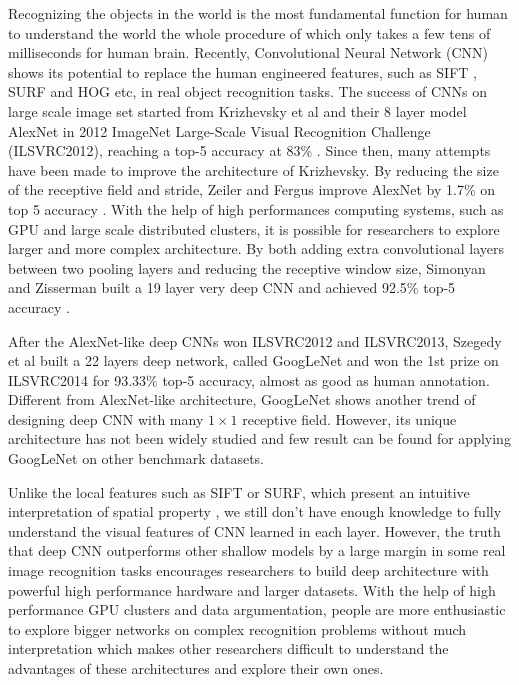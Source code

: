 ﻿Recognizing the objects in the world is the most fundamental function for human to understand the world the whole procedure of which only takes a few tens of milliseconds for human brain.
Recently, Convolutional Neural Network (CNN) shows its potential to replace the human engineered features, such as SIFT \cite{lowe1999object}, SURF \cite{bay2006surf} and HOG \cite{dalal2005histograms} etc, in real object recognition tasks. The success of CNNs on large scale image set started from Krizhevsky et al and their 8 layer model AlexNet in 2012 ImageNet Large-Scale Visual Recognition Challenge (ILSVRC2012), reaching a top-5 accuracy at 83\% \cite{krizhevsky2012imagenet}. Since then, many attempts have been made to improve the architecture of Krizhevsky.
By reducing the size of the receptive field and stride, Zeiler and Fergus improve AlexNet by 1.7\% on top 5 accuracy \cite{zeiler2014visualizing}. With the help of high performances computing systems, such as GPU and large scale distributed clusters, it is possible for researchers to explore larger and more complex architecture. By both adding extra convolutional layers between two pooling layers and reducing the receptive window size, Simonyan and Zisserman built a 19 layer very deep CNN and achieved 92.5\% top-5 accuracy \cite{simonyan2014very}.

After the AlexNet-like deep CNNs won ILSVRC2012 and ILSVRC2013, Szegedy et al built a 22 layers deep network, called GoogLeNet and won the 1st prize on ILSVRC2014 for 93.33\% top-5 accuracy, almost as good as human annotation\cite{szegedy2014going}. Different from AlexNet-like architecture, GoogLeNet shows another trend of designing deep CNN with many $1\times 1$ receptive field. However, its unique architecture has not been widely studied and few result can be found for applying GoogLeNet on other benchmark datasets.

Unlike the local features such as SIFT or SURF, which present an intuitive interpretation of spatial property%
, we still don't have enough knowledge to fully understand the visual features of CNN learned in each layer.
However, the truth that deep CNN outperforms other shallow models by a large margin in some real image recognition tasks encourages researchers to build deep architecture with powerful high performance hardware and larger datasets. With the help of high performance GPU clusters and data argumentation, people are more enthusiastic to explore bigger networks on complex recognition problems without much interpretation which makes other researchers difficult to understand the advantages of these architectures and explore their own ones.

